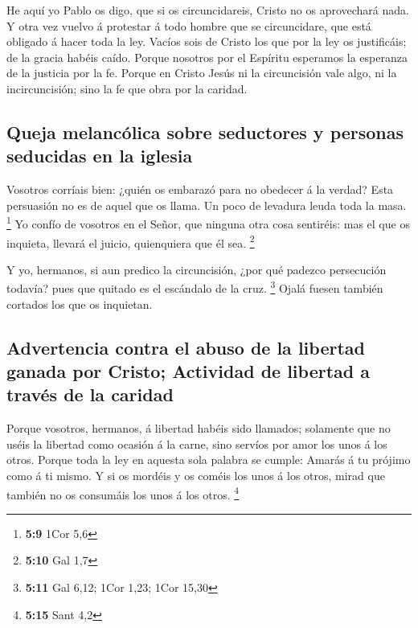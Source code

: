 He aquí yo Pablo os digo, que si os circuncidareis,
Cristo no os aprovechará nada.  Y otra vez vuelvo á
protestar á todo hombre que se circuncidare, que está obligado á hacer
toda la ley.  Vacíos sois de Cristo los que por la ley os
justificáis; de la gracia habéis caído.  Porque nosotros
por el Espíritu esperamos la esperanza de la justicia por la fe.
 Porque en Cristo Jesús ni la circuncisión vale algo, ni
la incircuncisión; sino la fe que obra por la caridad.

\hypertarget{queja-melancuxf3lica-sobre-seductores-y-personas-seducidas-en-la-iglesia}{%
\subsection{Queja melancólica sobre seductores y personas seducidas en
la
iglesia}\label{queja-melancuxf3lica-sobre-seductores-y-personas-seducidas-en-la-iglesia}}

 Vosotros corríais bien: ¿quién os embarazó para no
obedecer á la verdad?  Esta persuasión no es de aquel que
os llama.  Un poco de levadura leuda toda la masa.
\footnote{\textbf{5:9} 1Cor 5,6}  Yo confío de vosotros
en el Señor, que ninguna otra cosa sentiréis: mas el que os inquieta,
llevará el juicio, quienquiera que él sea. \footnote{\textbf{5:10} Gal
  1,7}

 Y yo, hermanos, si aun predico la circuncisión, ¿por qué
padezco persecución todavía? pues que quitado es el escándalo de la
cruz. \footnote{\textbf{5:11} Gal 6,12; 1Cor 1,23; 1Cor 15,30}
 Ojalá fuesen también cortados los que os inquietan.

\hypertarget{advertencia-contra-el-abuso-de-la-libertad-ganada-por-cristo-actividad-de-libertad-a-travuxe9s-de-la-caridad}{%
\subsection{Advertencia contra el abuso de la libertad ganada por
Cristo; Actividad de libertad a través de la
caridad}\label{advertencia-contra-el-abuso-de-la-libertad-ganada-por-cristo-actividad-de-libertad-a-travuxe9s-de-la-caridad}}

 Porque vosotros, hermanos, á libertad habéis sido
llamados; solamente que no uséis la libertad como ocasión á la carne,
sino servíos por amor los unos á los otros.  Porque toda
la ley en aquesta sola palabra se cumple: Amarás á tu prójimo como á ti
mismo.  Y si os mordéis y os coméis los unos á los otros,
mirad que también no os consumáis los unos á los otros. \footnote{\textbf{5:15}
  Sant 4,2}

